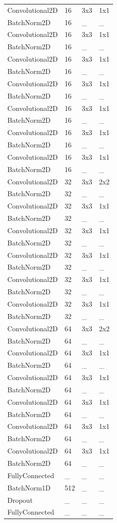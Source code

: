 \begin{center}
\begin{longtable}{|l|l|l|l|}
		\hline \hline
		\endlastfoot
		Convolutional2D & 16 & 3x3 & 1x1 \\
		BatchNorm2D & 16 & \_ & \_ \\ 
		Convolutional2D & 16 & 3x3 & 1x1 \\
		BatchNorm2D & 16 & \_ & \_ \\
		Convolutional2D & 16 & 3x3 & 1x1 \\
		BatchNorm2D & 16 & \_ & \_ \\
		Convolutional2D & 16 & 3x3 & 1x1 \\
		BatchNorm2D & 16 & \_ & \_ \\
		Convolutional2D & 16 & 3x3 & 1x1 \\
		BatchNorm2D & 16 & \_ & \_ \\
		Convolutional2D & 16 & 3x3 & 1x1 \\
		BatchNorm2D & 16 & \_ & \_ \\
		Convolutional2D & 16 & 3x3 & 1x1 \\
		BatchNorm2D & 16 & \_ & \_ \\
		Convolutional2D & 32 & 3x3 & 2x2 \\
		BatchNorm2D & 32 & \_ & \_ \\
		Convolutional2D & 32 & 3x3 & 1x1 \\
		BatchNorm2D & 32 & \_ & \_ \\
		Convolutional2D & 32 & 3x3 & 1x1 \\
		BatchNorm2D & 32 & \_ & \_ \\
		Convolutional2D & 32 & 3x3 & 1x1 \\
		BatchNorm2D & 32 & \_ & \_ \\
		Convolutional2D & 32 & 3x3 & 1x1 \\
		BatchNorm2D & 32 & \_ & \_ \\
		Convolutional2D & 32 & 3x3 & 1x1 \\
		BatchNorm2D & 32 & \_ & \_ \\
		Convolutional2D & 64 & 3x3 & 2x2 \\
		BatchNorm2D & 64 & \_ & \_ \\
		Convolutional2D & 64 & 3x3 & 1x1 \\
		BatchNorm2D & 64 & \_ & \_ \\
		Convolutional2D & 64 & 3x3 & 1x1 \\
		BatchNorm2D & 64 & \_ & \_ \\
		Convolutional2D & 64 & 3x3 & 1x1 \\
		BatchNorm2D & 64 & \_ & \_ \\
		Convolutional2D & 64 & 3x3 & 1x1 \\
		BatchNorm2D & 64 & \_ & \_ \\
		Convolutional2D & 64 & 3x3 & 1x1 \\
		BatchNorm2D & 64 & \_ & \_ \\
		FullyConnected & \_ & \_ & \_ \\
		BatchNorm1D & 512 & \_ & \_ \\
		Dropout & \_ & \_ & \_ \\
		FullyConnected & \_ & \_ & \_ \\
	\end{longtable}
\end{center}

